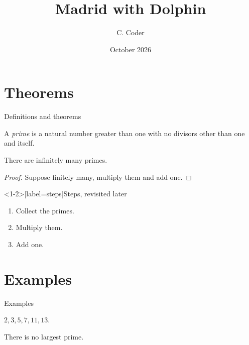\documentclass{beamer}
\title{Madrid with Dolphin}
\author{C. Coder}
\institute{FlashTeX}
\date{October 2026}
\begin{document}
\begin{frame}\titlepage\end{frame}
\section{Theorems}
\begin{frame}{Definitions and theorems}
  \begin{definition}
    A \emph{prime} is a natural number greater than one with no divisors
    other than one and itself.
  \end{definition}
  \begin{theorem}[Euclid]
    There are infinitely many primes.
  \end{theorem}
  \begin{proof}
    Suppose finitely many, multiply them and add one.
  \end{proof}
\end{frame}
\begin{frame}<1-2>[label=steps]{Steps, revisited later}
  \begin{enumerate}
    \item<1-> Collect the primes.
    \item<2-> Multiply them.
    \item<3-> Add one.
  \end{enumerate}
\end{frame}
\section{Examples}
\begin{frame}{Examples}
  \begin{example}
    $2, 3, 5, 7, 11, 13$.
  \end{example}
  \begin{corollary}
    There is no largest prime.
  \end{corollary}
\end{frame}
\end{document}
